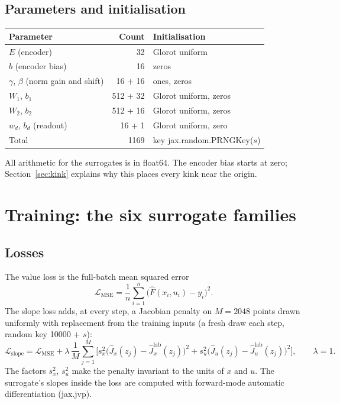 \documentclass[11pt]{article}
\begin{document}
\subsection{Parameters and initialisation}
\begin{center}
\begin{tabular}{lrl}
\toprule
Parameter & Count & Initialisation \\
\midrule
$E$ (encoder) & 32 & Glorot uniform \\
$b$ (encoder bias) & 16 & zeros \\
$\gamma$, $\beta$ (norm gain and shift) & 16 + 16 & ones, zeros \\
$W_1$, $b_1$ & 512 + 32 & Glorot uniform, zeros \\
$W_2$, $b_2$ & 512 + 16 & Glorot uniform, zeros \\
$w_d$, $b_d$ (readout) & 16 + 1 & Glorot uniform, zero \\
\midrule
Total & 1169 & key jax.random.PRNGKey($s$) \\
\bottomrule
\end{tabular}
\end{center}
All arithmetic for the surrogates is in float64. The encoder bias starts at zero; Section~\ref{sec:kink} explains why this places every kink near the origin.

\section{Training: the six surrogate families}\label{sec:train}

\subsection{Losses}
The value loss is the full-batch mean squared error
\begin{equation}
\mathcal L_{\text{MSE}} = \frac1n\sum_{i=1}^n\big(\hat F(x_i,u_i)-y_i\big)^2 .
\end{equation}
The slope loss adds, at every step, a Jacobian penalty on $M=2048$ points drawn uniformly with replacement from the training inputs (a fresh draw each step, random key 10000 + $s$):
\begin{equation}
\mathcal L_{\text{slope}} = \mathcal L_{\text{MSE}} + \lambda\,\frac1M\sum_{j=1}^M\Big[s_x^2\big(\hat J_x(z_j)-\hat J_x^{\text{lab}}(z_j)\big)^2 + s_u^2\big(\hat J_u(z_j)-\hat J_u^{\text{lab}}(z_j)\big)^2\Big],\qquad \lambda = 1 .
\end{equation}
The factors $s_x^2$, $s_u^2$ make the penalty invariant to the units of $x$ and $u$. The surrogate's slopes inside the loss are computed with forward-mode automatic differentiation (jax.jvp).
\end{document}
